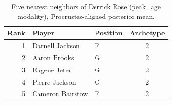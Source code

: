 \begin{table}[htbp]
  \centering\small
  \begin{tabular}{rllc}
    \toprule
    Rank & Player & Position & Archetype \\
    \midrule
    1 & Darnell Jackson & F & 2 \\
    2 & Aaron Brooks & G & 2 \\
    3 & Eugene Jeter & G & 2 \\
    4 & Pierre Jackson & G & 2 \\
    5 & Cameron Bairstow & F & 2 \\
    \bottomrule
  \end{tabular}
  \caption{Five nearest neighbors of Derrick Rose (peak_age modality), Procrustes-aligned posterior mean.}
  \label{tab:Derrick_Rose_neighbors_peak_age}
\end{table}

